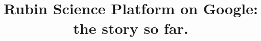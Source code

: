 \documentclass[11pt,twoside]{article}
\begin{document}

\title{Rubin Science Platform on Google: the story so far.}


\end{document}
